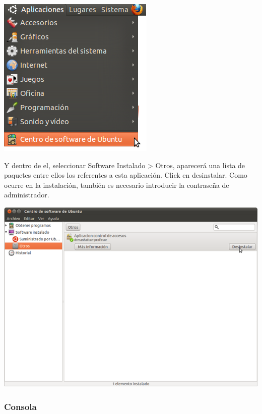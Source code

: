 \documentclass[11pt]{article}
\begin{document}
\begin{center}

    \includegraphics{imagenes/localLizacionCentroSoftware}

\end{center}

Y dentro de el, seleccionar Software Instalado > Otros, aparecerá una lista de paquetes entre ellos los referentes a esta aplicación. Click en desinstalar. Como ocurre en la instalación, también es necesario introducir la contraseña de administrador.

\begin{center}

    \includegraphics[width=.90\linewidth]{imagenes/desinstalar}

\end{center}

\subsubsection{Consola}
\end{document}
